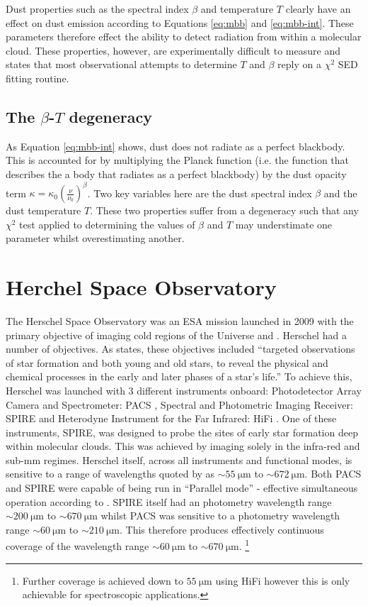 \documentclass{report}
\begin{document}
Dust properties such as the spectral index $\beta$ and temperature $T$ clearly have an effect on dust emission according to Equations \ref{eq:mbb} and \ref{eq:mbb-int}. These parameters therefore effect the ability to detect radiation from within a molecular cloud. These properties, however, are experimentally difficult to measure and \textcite{kelly} states that most observational attempts to determine $T$ and $\beta$ reply on a $\chi^{2}$ SED fitting routine.

\subsection{The $\beta$-$T$ degeneracy}
As Equation \ref{eq:mbb-int} shows, dust does not radiate as a perfect blackbody. This is accounted for by multiplying the Planck function (i.e. the function that describes the a body that radiates as a perfect blackbody) by the dust opacity term $\kappa = \kappa_{0}(\frac{\nu}{\nu_{0}})^{\beta}$. Two key variables here are the dust spectral index $\beta$ and the dust temperature $T$. These two properties suffer from a degeneracy \parencite{degen} such that any $\chi^{2}$ test applied to determining the values of $\beta$ and $T$ may understimate one parameter whilst overestimating another. 



\section{Herchel Space Observatory}
The Herschel Space Observatory was an ESA mission launched in 2009 with the primary objective of imaging cold regions of the Universe \parencite{herschel} and \parencite{fact}. Herschel had a number of objectives. As \textcite{fact} states, these objectives included ``targeted observations of star formation and both young and old stars, to reveal the physical and chemical processes in the early and later phases of a star’s life.'' To achieve this, Herschel was launched with 3 different instruments onboard: Photodetector Array Camera and Spectrometer: PACS \parencite{PACS}, Spectral and Photometric Imaging Receiver: SPIRE \parencite{SPIRE} and Heterodyne Instrument for the Far Infrared: HiFi \parencite{HiFi}. One of these instruments, SPIRE, was designed to probe the sites of early star formation deep within molecular clouds. This was achieved by imaging solely in the infra-red and sub-mm regimes. Herschel itself, across all instruments and functional modes, is sensitive to a range of wavelengths quoted by \textcite{herschel} as $\sim \SI{55}{\micro\meter}$ to $\sim \SI{672}{\micro\meter}$. Both PACS and SPIRE were capable of being run in ``Parallel mode'' - effective simultaneous operation according to \textcite{herschel}. SPIRE itself had an photometry wavelength range
$\sim \SI{200}{\micro\meter}$ to $\sim \SI{670}{\micro\meter}$ whilst PACS was sensitive to a photometry wavelength range $\sim \SI{60}{\micro\meter}$ to $\sim \SI{210}{\micro\meter}$. This therefore produces effectively continuous coverage of the wavelength range $\sim \SI{60}{\micro\meter}$ to $\sim \SI{670}{\micro\meter}$.
\footnote{Further coverage is achieved down to $\SI{55}{\micro\meter}$ using HiFi however this is only achievable for spectroscopic applications.}
\end{document}
